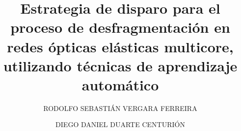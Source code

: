 \documentclass[final,fmstyle]{./util/fpunathesis}
\title{Estrategia de disparo para el proceso de desfragmentación en redes ópticas elásticas multicore, utilizando técnicas de aprendizaje automático}
\author{RODOLFO SEBASTIÁN VERGARA FERREIRA \and DIEGO DANIEL DUARTE CENTURIÓN}
\begin{document}
\renewcommand{\listtablename}{Lista de Tablas}
\renewcommand{\tablename}{Tabla}
\maketitle     %

%


\tableofcontents
\listoffigures
\listoftables
%



\mainmatter  %


%
%







\appendix   %


\printbibliography
\end{document}
